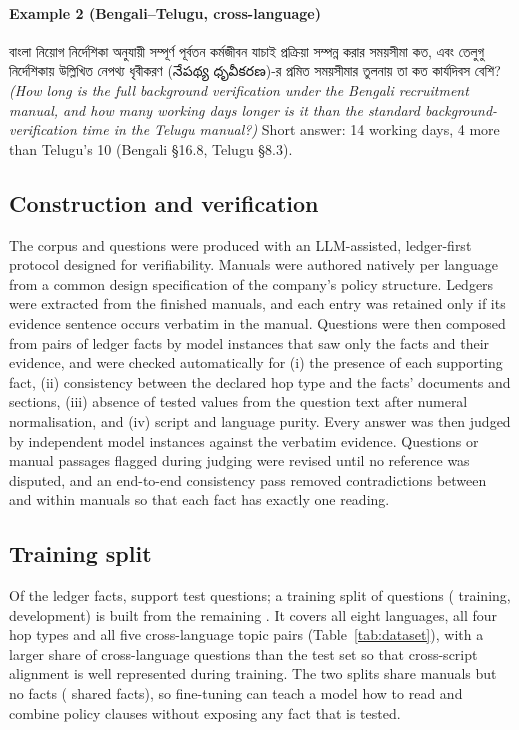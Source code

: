 \documentclass[preprint,12pt]{elsarticle}
\begin{document}
\paragraph{Example 2 (Bengali--Telugu, cross-language)}
{\bengali বাংলা নিয়োগ নির্দেশিকা অনুযায়ী সম্পূর্ণ পূর্বতন কর্মজীবন যাচাই প্রক্রিয়া সম্পন্ন করার সময়সীমা কত, এবং তেলুগু নির্দেশিকায় উল্লিখিত নেপথ্য ধৃবীকরণ ({\telugu నేపథ్య ధృవీకరణ})-র প্রমিত সময়সীমার তুলনায় তা কত কার্যদিবস বেশি?}
\emph{(How long is the full background verification under the Bengali recruitment manual, and how many working days longer is it than the standard background-verification time in the Telugu manual?)} Short answer: 14 working days, 4 more than Telugu's 10 (Bengali \S16.8, Telugu \S8.3).

\subsection{Construction and verification}
The corpus and questions were produced with an LLM-assisted, ledger-first protocol designed for verifiability. Manuals were authored natively per language from a common design specification of the company's policy structure. Ledgers were extracted from the finished manuals, and each entry was retained only if its evidence sentence occurs verbatim in the manual. Questions were then composed from pairs of ledger facts by model instances that saw only the facts and their evidence, and were checked automatically for (i) the presence of each supporting fact, (ii) consistency between the declared hop type and the facts' documents and sections, (iii) absence of tested values from the question text after numeral normalisation, and (iv) script and language purity. Every answer was then judged by independent model instances against the verbatim evidence. Questions or manual passages flagged during judging were revised until no reference was disputed, and an end-to-end consistency pass removed contradictions between and within manuals so that each fact has exactly one reading.

\subsection{Training split}
\label{sec:train}
Of the \NFacts{} ledger facts, \NTestFacts{} support test questions; a training split of \NTrainDev{} questions (\NTrain{} training, \NDev{} development) is built from the remaining \NFreeFacts{}. It covers all eight languages, all four hop types and all five cross-language topic pairs (Table~\ref{tab:dataset}), with a larger share of cross-language questions than the test set so that cross-script alignment is well represented during training. The two splits share manuals but no facts (\NSharedFacts{} shared facts), so fine-tuning can teach a model how to read and combine policy clauses without exposing any fact that is tested. \TrainCheck{}
\end{document}

